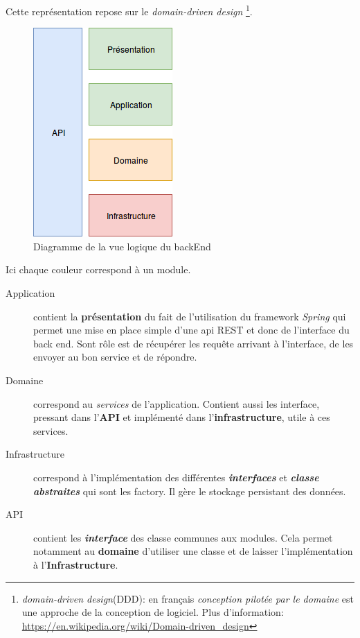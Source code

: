 \documentclass[12pt]{article}
\begin{document}
Cette représentation repose sur le \textit{domain-driven design} \footnote{\textit{domain-driven design}(DDD): en français \textit{conception pilotée par le domaine} est une approche de la conception de logiciel. Plus d'information: \url{https://en.wikipedia.org/wiki/Domain-driven_design}}.

\begin{figure}[h]
    \centering
    \includegraphics[]{img/Vue_logique_back.png}
    \caption{Diagramme de la vue logique du backEnd}
\end{figure}

Ici chaque couleur correspond à un module.


\begin{description}
    \item [Application] contient la \textbf{présentation} du fait de l'utilisation du framework \textit{Spring} qui permet une mise en place simple d'une api REST et donc de l'interface du back end. Sont rôle est de récupérer les requête arrivant à l'interface, de les envoyer au bon service et de répondre.
    \item [Domaine] correspond au \textit{services} de l'application. Contient aussi les interface, pressant  dans l'\textbf{API} et implémenté dans l'\textbf{infrastructure}, utile à ces services.
    \item [Infrastructure] correspond à l'implémentation des différentes \textbf{\textit{interfaces}} et \textbf{\textit{classe abstraites}} qui sont les factory. Il gère le stockage persistant des données.
    \item [API] contient les \textbf{\textit{interface}} des classe communes aux modules. Cela permet notamment au \textbf{domaine} d'utiliser une classe et de laisser l'implémentation à l'\textbf{Infrastructure}.
\end{description}
\end{document}
